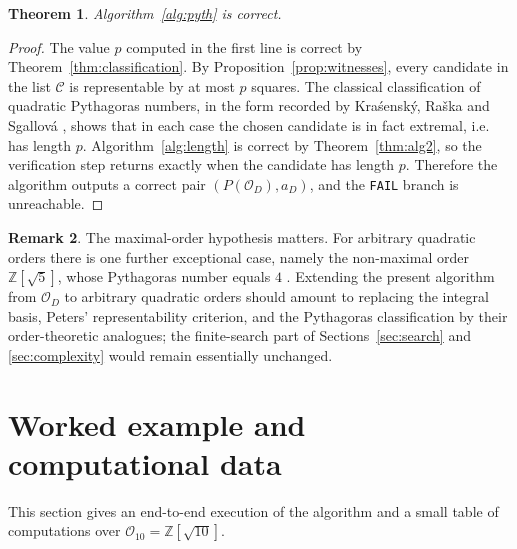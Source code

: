 \documentclass[manuscript,screen]{acmart}
\theoremstyle{plain}
\newtheorem{theorem}{Theorem}[section]
\theoremstyle{definition}
\theoremstyle{nonitalicremark}
\newtheorem{remark}[theorem]{Remark}
\newcommand{\Z}{\mathbb{Z}}
\newcommand{\OD}{\mathcal{O}_D}
\newcommand{\OO}{\mathcal{O}}
\begin{document}
\begin{theorem}\label{thm:pyth}
Algorithm~\ref{alg:pyth} is correct.
\end{theorem}

\begin{proof}
The value $p$ computed in the first line is correct by Theorem~\ref{thm:classification}.
By Proposition~\ref{prop:witnesses}, every candidate in the list $\mathcal C$ is representable by
at most $p$ squares.
The classical classification of quadratic Pythagoras numbers, in the form recorded by
Kra\'sensk\'y, Ra\v ska and Sgallov\'a \cite[Theorem~3.1]{KRS}, shows that in each case the chosen
candidate is in fact extremal, i.e. has length $p$.
Algorithm~\ref{alg:length} is correct by Theorem~\ref{thm:alg2}, so the verification step returns
exactly when the candidate has length $p$. Therefore the algorithm outputs a correct pair
$(P(\OD),a_D)$, and the \texttt{FAIL} branch is unreachable.
\end{proof}

\begin{remark}
The maximal-order hypothesis matters. For arbitrary quadratic orders there is one further
exceptional case, namely the non-maximal order $\Z[\sqrt 5]$, whose Pythagoras number equals
$4$ \cite[Theorem~3.1]{KRS}. Extending the present algorithm from $\OD$ to arbitrary quadratic
orders should amount to replacing the integral basis, Peters' representability criterion, and the
Pythagoras classification by their order-theoretic analogues; the finite-search part of
Sections~\ref{sec:search} and \ref{sec:complexity} would remain essentially unchanged.
\end{remark}

\section{Worked example and computational data}\label{sec:examples}

This section gives an end-to-end execution of the algorithm and a small table of computations over
$\OO_{10}=\Z[\sqrt{10}]$.
\end{document}

